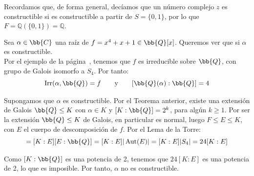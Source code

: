 Recordamos que, de forma general, decíamos que un número complejo $z$ es constructible si es constructible a partir de $S=\{0,1\}$, por lo que $F=\mathbb{Q}(\{0,1\})=\mathbb{Q}$. 

\begin{ejemplo}\label{ejemplo:no_constructible}
    Sea $\alpha\in \bb{C}$ una raíz de $f=x^4+x+1\in \bb{Q}[x]$. Queremos ver que si $\alpha$ es constructible.\\
    
    Por el ejemplo de la página~\pageref{ejemplo:resolvente_cubica2}, tenemos que $f$ es irreducible sobre $\bb{Q}$, con grupo de Galois isomorfo a $S_4$. Por tanto:
    \begin{equation*}
        \Irr(\alpha,\bb{Q}) = f\qquad \text{y}\qquad [\bb{Q}(\alpha):\bb{Q}] = 4
    \end{equation*}

    Supongamos que $\alpha$ es constructible. Por el Teorema anterior, existe una extensión de Galois $\bb{Q}\leq K$ con $\alpha\in K$ y $[K:\bb{Q}] = 2^k$, para algún $k\geq 1$. Por ser la extensión $\bb{Q}\leq K$ de Galois, en particular es normal, luego $F\leq E\leq K$, con $E$ el cuerpo de descomposición de $f$. Por el Lema de la Torre:
    \begin{equation*}
        [K:\bb{Q}] = [K:E][E:\bb{Q}] = [K:E]|\Aut(E)| = [K:E]|S_4| = 24[K:E]
    \end{equation*}

    Como $[K:\bb{Q}]$ es una potencia de 2, tenemos que $24[K:E]$ es una potencia de 2, lo que es imposible. Por tanto, $\alpha$ no es constructible.
\end{ejemplo}


